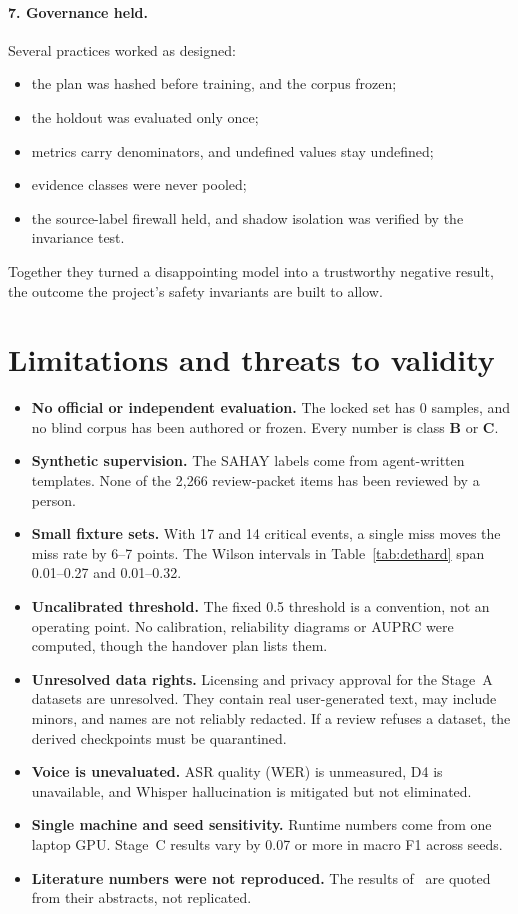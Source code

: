 \documentclass[11pt,a4paper]{article}
\newcommand{\evB}{\textsf{\textbf{B}}}
\newcommand{\evC}{\textsf{\textbf{C}}}
\begin{document}
\paragraph{7. Governance held.}
Several practices worked as designed:
\begin{itemize}
  \item the plan was hashed before training, and the corpus frozen;
  \item the holdout was evaluated only once;
  \item metrics carry denominators, and undefined values stay undefined;
  \item evidence classes were never pooled;
  \item the source-label firewall held, and shadow isolation was verified by the invariance test.
\end{itemize}
Together they turned a disappointing model into a trustworthy negative result, the outcome the
project's safety invariants are built to allow.

\section{Limitations and threats to validity}
\label{sec:limits}
\begin{itemize}
  \item \textbf{No official or independent evaluation.} The locked set has 0 samples, and no blind
        corpus has been authored or frozen. Every number is class \evB{} or \evC.
  \item \textbf{Synthetic supervision.} The SAHAY labels come from agent-written templates. None of
        the 2{,}266 review-packet items has been reviewed by a person.
  \item \textbf{Small fixture sets.} With 17 and 14 critical events, a single miss moves the miss
        rate by 6--7 points. The Wilson intervals in Table~\ref{tab:dethard} span 0.01--0.27 and
        0.01--0.32.
  \item \textbf{Uncalibrated threshold.} The fixed 0.5 threshold is a convention, not an operating
        point. No calibration, reliability diagrams or AUPRC were computed, though the handover
        plan lists them.
  \item \textbf{Unresolved data rights.} Licensing and privacy approval for the Stage~A datasets
        are unresolved. They contain real user-generated text, may include minors, and names are not
        reliably redacted. If a review refuses a dataset, the derived checkpoints must be
        quarantined.
  \item \textbf{Voice is unevaluated.} ASR quality (WER) is unmeasured, D4 is unavailable, and
        Whisper hallucination is mitigated but not eliminated.
  \item \textbf{Single machine and seed sensitivity.} Runtime numbers come from one laptop GPU.
        Stage~C results vary by 0.07 or more in macro F1 across seeds.
  \item \textbf{Literature numbers were not reproduced.} The results of~\cite{hu2024,islam2024}
        are quoted from their abstracts, not replicated.
\end{itemize}
\end{document}
